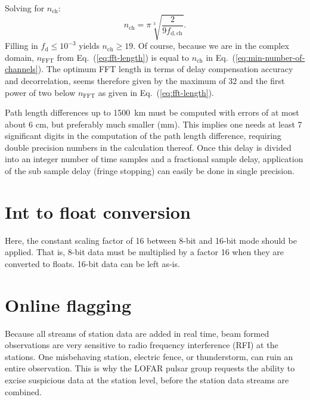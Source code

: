 \documentclass[a4paper,twoside]{article}
\begin{document}
Solving for $n_\mathrm{ch}$:
\begin{equation}
n_\mathrm{ch} = \pi\sqrt[3]{\frac{2}{9f_\mathrm{d,ch}}}.
\label{eq:min-number-of-channels}
\end{equation}
Filling in $f_\mathrm{d} \le 10^{-3}$ yields $n_\mathrm{ch} \ge
19$. Of course, because we are in the complex domain, $n_\mathrm{FFT}$
from Eq.~(\ref{eq:fft-length}) is equal to $n_\mathrm{ch}$ in
Eq.~(\ref{eq:min-number-of-channels}). The optimum FFT length in terms
of delay compensation accuracy and decorrelation, seems therefore given
by the maximum of 32 and the first power of two below $n_\mathrm{FFT}$
as given in Eq.~(\ref{eq:fft-length}).


Path length differences up to 1500~km must be computed with errors of
at most about 6 cm, but preferably much smaller (mm). This implies one
needs at least 7 significant digits in the computation of the path
length difference, requiring double precision numbers in the
calculation thereof. Once this delay is divided into an integer number
of time samples and a fractional sample delay, application of the sub
sample delay (fringe stopping) can easily be done in single precision.



%
%

\section{Int to float conversion}

Here, the constant scaling factor of 16 between 8-bit and 16-bit mode
should be applied. That is, 8-bit data must be multiplied by a factor
16 when they are converted to floats. 16-bit data can be left as-is.
 


%
%

\section{Online flagging}
\label{sec:online-flagging}


Because all streams of station data are added in real time, beam
formed observations are very sensitive to radio frequency interference
(RFI) at the stations. One misbehaving station, electric fence, or
thunderstorm, can ruin an entire observation. This is why the LOFAR
pulsar group requests the ability to excise suspicious data
at the station level, before the station data streams are combined.
\end{document}
